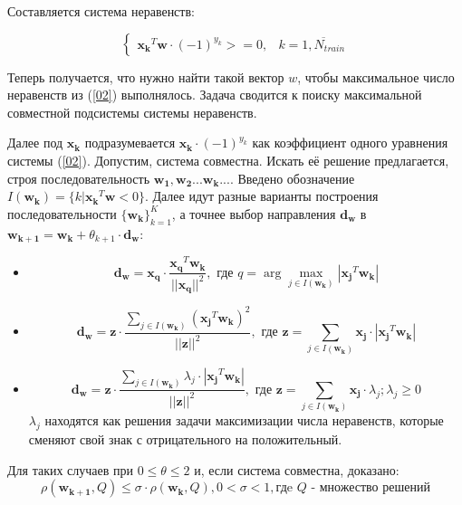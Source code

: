 \documentclass[a4paper]{article}
\newcommand{\ik}{I(\wk)}
\newcommand{\w}{\bm{w}}
\newcommand{\wk}{\bm{w_k}}
\newcommand{\xj}{\bm{x_j}}
\newcommand{\yk}{y_k}
\newcommand{\xk}{\bm{x_k}}
\begin{document}
Составляется система неравенств: 

\begin{equation}\label{02}
\begin{cases}
\xk^T\w \cdot (-1) ^ {\yk} >=0, & k = \overline{1,N_{train}} 
\end{cases}
\end{equation}

Теперь получается, что нужно найти такой вектор $w$, чтобы максимальное число неравенств из (\ref{02}) выполнялось. Задача сводится к поиску максимальной совместной подсистемы системы неравенств.

Далее под $\xk$ подразумевается $\xk \cdot (-1)^{y_k}$ как коэффициент одного уравнения системы (\ref{02}). Допустим, система совместна. Искать её решение предлагается, строя последовательность $\bm{w_1}, \bm{w_2} ... \wk ...$. Введено обозначение $I(\wk) = \{k|\xk^T\w < 0\}$. Далее идут разные варианты построения последовательности $\{\wk\}_{k = 1}^{K}$, а точнее выбор направления $\bm{d_w}$ в $\bm{w_{k + 1}} = \wk + \theta_{k+1} \cdot \bm{d_w}$:
\begin{itemize}

\item
\begin{equation}
\bm{d_w} = \bm{x_q} \cdot \frac{\bm{x_q}^T\wk}{||\bm{x_q}||^2}, \text{ где } q = \arg\underset{j \in \ik}{\max} |\xj^T\wk|
\end{equation}

\item
\begin{equation} \label{04}
\bm{d_w} = \bm{z} \cdot \frac{\sum_{j \in \ik} (\xj^T\wk)^2 }{||\bm{z}||^2}, \text{ где } \bm{z} = \sum_{j \in \ik}\xj \cdot |\xj^T\wk|
\end{equation}

\item
\begin{equation}
\bm{d_w} = \bm{z} \cdot \frac{\sum_{j \in \ik} \lambda_j \cdot |\xj^T\wk| }{||\bm{z}||^2}, \text{ где }  \bm{z} = \sum_{j \in \ik} \xj \cdot \lambda_j; \lambda_j \ge 0
\end{equation}
$\lambda_j$ находятся как решения задачи максимизации числа неравенств, которые сменяют свой знак с отрицательного на положительный.
\end{itemize}

Для таких случаев при $0 \le \theta \le 2$ и, если система совместна, доказано\cite{agmon}:
$$
\rho(\bm{w_{k+1}}, Q) \le \sigma \cdot \rho(\bm{w_{k}}, Q), 0 < \sigma < 1 
, \text{гдe }Q \text{ - множество решений}
$$
\end{document}
